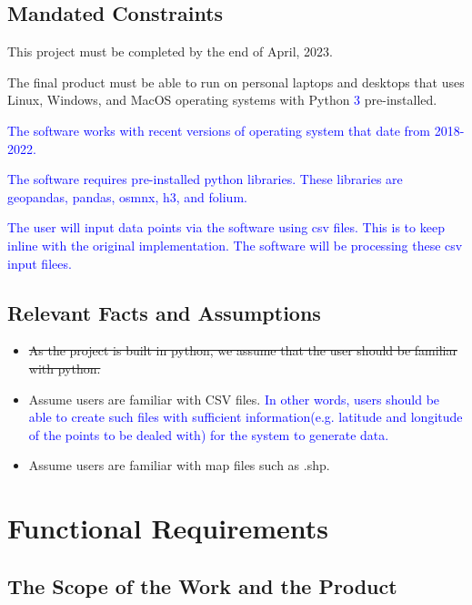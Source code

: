 \documentclass[12pt, titlepage]{article}
\begin{document}
\subsection{Mandated Constraints}
\begin{itemize}
    \item This project must be completed by the end of April, 2023.
    \item The final product must be able to run on personal laptops and desktops that uses Linux, Windows, and MacOS operating systems with Python \textcolor{blue}{3} pre-installed. \textcolor{blue}{The software works with recent versions of operating system that date from 2018-2022. 
    \item The software requires pre-installed python libraries. These libraries are geopandas, pandas, osmnx, h3, and folium.
    \item The user will input data points via the software using csv files. This is to keep inline with the original implementation. The software will be processing these csv input filees.}
\end{itemize}


\subsection{Relevant Facts and Assumptions}
\begin{itemize}
    \item \sout{As the project is built in python, we assume that the user should be familiar with python.}
    \item Assume users are familiar with CSV files. \textcolor{blue}{ In other words, users should be able to create such files with sufficient information(e.g. latitude and longitude of the points to be dealed with) for the system to generate data.}
    \item Assume users are familiar with map files such as .shp.
\end{itemize}

\newpage
\section{Functional Requirements}

\subsection{The Scope of the Work and the Product}
\end{document}
